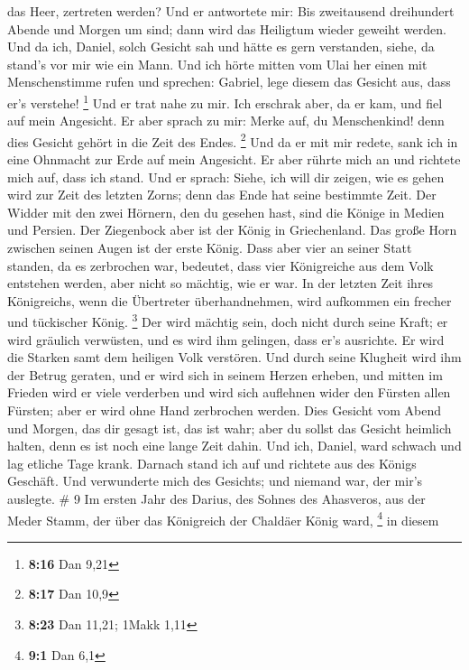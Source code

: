 das Heer, zertreten werden?  Und er antwortete mir: Bis
zweitausend dreihundert Abende und Morgen um sind; dann wird das
Heiligtum wieder geweiht werden.  Und da ich, Daniel, solch
Gesicht sah und hätte es gern verstanden, siehe, da stand's vor mir wie
ein Mann.  Und ich hörte mitten vom Ulai her einen mit
Menschenstimme rufen und sprechen: Gabriel, lege diesem das Gesicht aus,
dass er's verstehe! \footnote{\textbf{8:16} Dan 9,21}  Und
er trat nahe zu mir. Ich erschrak aber, da er kam, und fiel auf mein
Angesicht. Er aber sprach zu mir: Merke auf, du Menschenkind! denn dies
Gesicht gehört in die Zeit des Endes. \footnote{\textbf{8:17} Dan 10,9}
 Und da er mit mir redete, sank ich in eine Ohnmacht zur
Erde auf mein Angesicht. Er aber rührte mich an und richtete mich auf,
dass ich stand.  Und er sprach: Siehe, ich will dir zeigen,
wie es gehen wird zur Zeit des letzten Zorns; denn das Ende hat seine
bestimmte Zeit.  Der Widder mit den zwei Hörnern, den du
gesehen hast, sind die Könige in Medien und Persien.  Der
Ziegenbock aber ist der König in Griechenland. Das große Horn zwischen
seinen Augen ist der erste König.  Dass aber vier an seiner
Statt standen, da es zerbrochen war, bedeutet, dass vier Königreiche aus
dem Volk entstehen werden, aber nicht so mächtig, wie er war.
 In der letzten Zeit ihres Königreichs, wenn die Übertreter
überhandnehmen, wird aufkommen ein frecher und tückischer König.
\footnote{\textbf{8:23} Dan 11,21; 1Makk 1,11}  Der wird
mächtig sein, doch nicht durch seine Kraft; er wird gräulich verwüsten,
und es wird ihm gelingen, dass er's ausrichte. Er wird die Starken samt
dem heiligen Volk verstören.  Und durch seine Klugheit wird
ihm der Betrug geraten, und er wird sich in seinem Herzen erheben, und
mitten im Frieden wird er viele verderben und wird sich auflehnen wider
den Fürsten allen Fürsten; aber er wird ohne Hand zerbrochen werden.
 Dies Gesicht vom Abend und Morgen, das dir gesagt ist, das
ist wahr; aber du sollst das Gesicht heimlich halten, denn es ist noch
eine lange Zeit dahin.  Und ich, Daniel, ward schwach und
lag etliche Tage krank. Darnach stand ich auf und richtete aus des
Königs Geschäft. Und verwunderte mich des Gesichts; und niemand war, der
mir's auslegte. \# 9  Im ersten Jahr des Darius, des Sohnes
des Ahasveros, aus der Meder Stamm, der über das Königreich der Chaldäer
König ward, \footnote{\textbf{9:1} Dan 6,1}  in diesem
